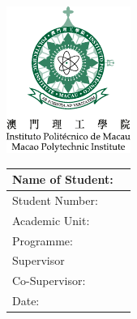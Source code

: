 \begin{center}
	\includegraphics[width=0.25\linewidth]{MPI.pdf}
		
	\vspace*{2in}

	\@title
	
	\vfill

	\begin{tabular}{ll}
		Name of Student: & \@author\\
		\midrule
		Student Number: & \StudentNumber\\
		\midrule
		Academic Unit: & \AcademicUnit\\
		\midrule
		Programme: & \Programme\\
		\midrule
		Supervisor & \Supervisor\\
		\midrule
		Co-Supervisor: & \Cosupervisor\\
		\midrule
		Date: & \Date
	\end{tabular}
\end{center}